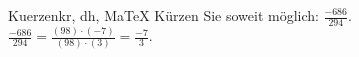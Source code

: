 \begin{MAufgabe}{Kuerzen}{kr, dh, MaTeX}
K\"urzen Sie soweit m\"oglich: $\frac{-686}{294}$.\\ 
\ifLsg\MLoesung
\quad $\frac{-686}{294}=\frac{(98)\cdot(-7)}{(98)\cdot(3)}=\frac{-7}{3}$.\else\relax\fi
 \end{MAufgabe}